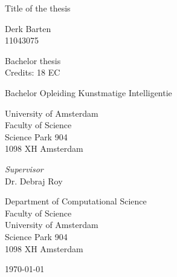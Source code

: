 \begin{center}

\vspace{2.5cm}

\begin{Huge}
Title of the thesis
\end{Huge}

\vspace{1.5cm}

Derk Barten\\
11043075

\vspace{1.5cm}

Bachelor thesis\\
Credits: 18 EC

\vspace{0.5cm}

Bachelor Opleiding Kunstmatige Intelligentie

\vspace{0.25cm}

University of Amsterdam\\
Faculty of Science\\
Science Park 904\\
1098 XH Amsterdam

\vspace{4cm}

\emph{Supervisor}\\
Dr. Debraj Roy

\vspace{0.25cm}

Department of Computational Science\\
Faculty of Science\\
University of Amsterdam\\
Science Park 904\\
1098 XH  Amsterdam

\vspace{1.5cm}

\today

\end{center}

